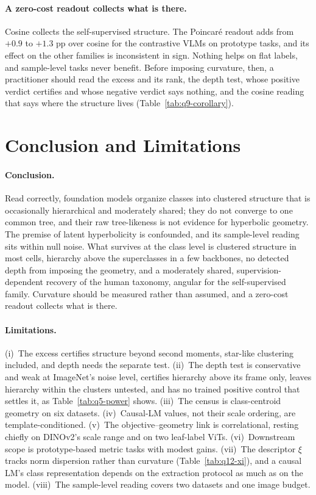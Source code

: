 \documentclass{article}
\theoremstyle{definition}
\theoremstyle{plain}
\theoremstyle{remark}
\begin{document}
\paragraph{A zero-cost readout collects what is there.} Cosine collects the self-supervised structure. The Poincar\'{e} readout adds from $+0.9$ to $+1.3$ pp over cosine for the contrastive VLMs on prototype tasks, and its effect on the other families is inconsistent in sign. Nothing helps on flat labels, and sample-level tasks never benefit. Before imposing curvature, then, a practitioner should read the excess and its rank, the depth test, whose positive verdict certifies and whose negative verdict says nothing, and the cosine reading that says where the structure lives (Table~\ref{tab:q9-corollary}). %

\section{Conclusion and Limitations}
\label{sec:discussion}

\paragraph{Conclusion.} Read correctly, foundation models organize classes into clustered structure that is occasionally hierarchical and moderately shared; they do not converge to one common tree, and their raw tree-likeness is not evidence for hyperbolic geometry. The premise of latent hyperbolicity is confounded, and its sample-level reading sits within null noise. What survives at the class level is clustered structure in most cells, hierarchy above the superclasses in a few backbones, no detected depth from imposing the geometry, and a moderately shared, supervision-dependent recovery of the human taxonomy, angular for the self-supervised family. Curvature should be measured rather than assumed, and a zero-cost readout collects what is there.

\paragraph{Limitations.} (i)~The excess certifies structure beyond second moments, star-like clustering included, and depth needs the separate test. (ii)~The depth test is conservative and weak at ImageNet's noise level, certifies hierarchy above its frame only, leaves hierarchy within the clusters untested, and has no trained positive control that settles it, as Table~\ref{tab:q5-power} shows. (iii)~The census is class-centroid geometry on six datasets. (iv)~Causal-LM values, not their scale ordering, are template-conditioned. (v)~The objective--geometry link is correlational, resting chiefly on DINOv2's scale range and on two leaf-label ViTs. (vi)~Downstream scope is prototype-based metric tasks with modest gains. (vii)~The descriptor $\xi$ tracks norm dispersion rather than curvature (Table~\ref{tab:q12-xi}), and a causal LM's class representation depends on the extraction protocol as much as on the model. (viii)~The sample-level reading covers two datasets and one image budget.
\end{document}
